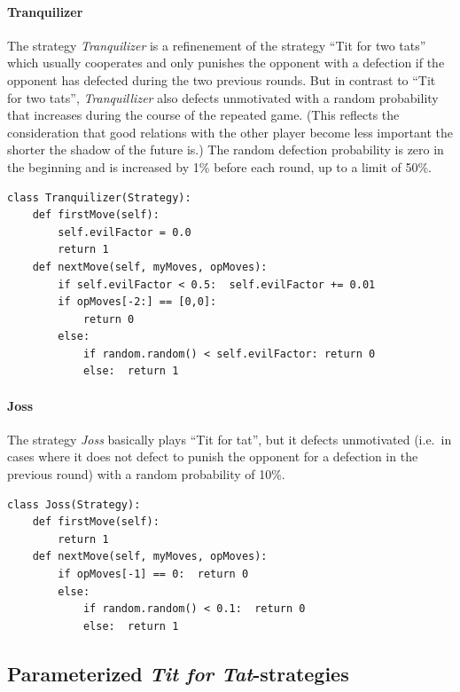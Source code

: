 \paragraph{Tranquilizer} The strategy {\em Tranquilizer} is a refinenement of
the strategy ``Tit for two tats'' which usually cooperates and only punishes
the opponent with a defection if the opponent has defected during the two
previous rounds. But in contrast to ``Tit for two tats'', {\em Tranquillizer}
also defects unmotivated with a random probability that increases during the
course of the repeated game. (This reflects the consideration that good
relations with the other player become less important the shorter the shadow
of the future is.) The random defection probability is zero in the beginning
and is increased by 1\% before each round, up to a limit of 50\%.
\begin{scriptsize}
\begin{verbatim}
class Tranquilizer(Strategy):
    def firstMove(self):
        self.evilFactor = 0.0
        return 1
    def nextMove(self, myMoves, opMoves):
        if self.evilFactor < 0.5:  self.evilFactor += 0.01
        if opMoves[-2:] == [0,0]:
            return 0
        else:
            if random.random() < self.evilFactor: return 0
            else:  return 1
\end{verbatim}
\end{scriptsize}

\paragraph{Joss} The strategy {\em Joss} basically plays ``Tit for tat'', but
it defects unmotivated (i.e.\ in cases where it does not defect to punish the
opponent for a defection in the previous round) with a random probability of
10\%.
\begin{scriptsize}
\begin{verbatim}
class Joss(Strategy):
    def firstMove(self):
        return 1
    def nextMove(self, myMoves, opMoves):
        if opMoves[-1] == 0:  return 0
        else:
            if random.random() < 0.1:  return 0
            else:  return 1
\end{verbatim}
\end{scriptsize}

\newpage

\subsection{Parameterized {\em Tit for Tat}-strategies}
\label{parameterizedTFTs}

